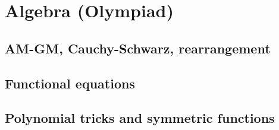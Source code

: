 
\section{Algebra (Olympiad)}

\subsection{AM-GM, Cauchy-Schwarz, rearrangement}


\subsection{Functional equations}


\subsection{Polynomial tricks and symmetric functions}

